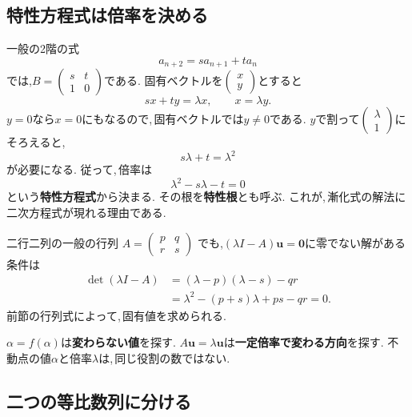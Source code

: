 \subsection{特性方程式は倍率を決める}\label{節：倍率を決める方程式}

一般の2階の式
\[
 a_{n+2}=s a_{n+1}+t a_n
\]
では,$B=\begin{pmatrix}s&t\\1&0\end{pmatrix}$である.
固有ベクトルを$\begin{pmatrix}x\\y\end{pmatrix}$とすると
\[
 sx+ty=\lambda x,\qquad x=\lambda y.
\]
$y=0$なら$x=0$にもなるので,\,固有ベクトルでは$y\ne0$である.
$y$で割って$\begin{pmatrix}\lambda\\1\end{pmatrix}$にそろえると,
\[
 s\lambda+t=\lambda^2
\]
が必要になる. 従って,\,倍率は
\[
 \lambda^2-s\lambda-t=0
\]
という\textbf{特性方程式}から決まる.
その根を\textbf{特性根}とも呼ぶ.
これが,\,漸化式の解法に二次方程式が現れる理由である.

二行二列の一般の行列
$A=\begin{pmatrix}p&q\\r&s\end{pmatrix}$
でも,$(\lambda I-A)\boldsymbol u=\boldsymbol0$に零でない解がある条件は
\[
 \begin{aligned}
 \det(\lambda I-A)
 &=(\lambda-p)(\lambda-s)-qr\\
 &=\lambda^2-(p+s)\lambda+ps-qr=0.
 \end{aligned}
\]
前節の行列式によって,\,固有値を求められる.

\begin{bookpoint}
$\alpha=f(\alpha)$は\textbf{変わらない値}を探す.
$A\boldsymbol u=\lambda\boldsymbol u$は\textbf{一定倍率で変わる方向}を探す.
不動点の値$\alpha$と倍率$\lambda$は,\,同じ役割の数ではない.
\end{bookpoint}

\subsection{二つの等比数列に分ける}

